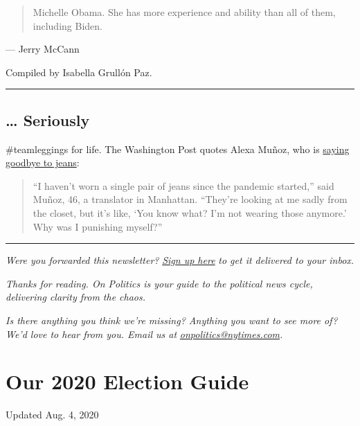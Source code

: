 \begin{quote}
Michelle Obama. She has more experience and ability than all of them,
including Biden.
\end{quote}

--- Jerry McCann

Compiled by Isabella Grullón Paz.

\begin{center}\rule{0.5\linewidth}{\linethickness}\end{center}

\hypertarget{-seriously}{%
\subsection{\ldots{} Seriously}\label{-seriously}}

\#teamleggings for life. The Washington Post quotes Alexa Muñoz, who is
\href{https://www.washingtonpost.com/business/2020/07/28/jeans-sales-leggings-pandemic/}{saying
goodbye to jeans}:

\begin{quote}
``I haven't worn a single pair of jeans since the pandemic started,''
said Muñoz, 46, a translator in Manhattan. ``They're looking at me sadly
from the closet, but it's like, `You know what? I'm not wearing those
anymore.' Why was I punishing myself?''
\end{quote}

\begin{center}\rule{0.5\linewidth}{\linethickness}\end{center}

\emph{Were you forwarded this newsletter?}
\href{https://www.nytimes.com/newsletters/politics}{\emph{Sign up here}}
\emph{to get it delivered to your inbox.}

\emph{Thanks for reading. On Politics is your guide to the political
news cycle, delivering clarity from the chaos.}

\emph{Is there anything you think we're missing? Anything you want to
see more of? We'd love to hear from you. Email us at}
\href{mailto:onpolitics@nytimes.com}{\emph{onpolitics@nytimes.com}}\emph{.}

\hypertarget{our-2020-election-guide}{%
\section{Our 2020 Election Guide}\label{our-2020-election-guide}}

Updated Aug. 4, 2020

